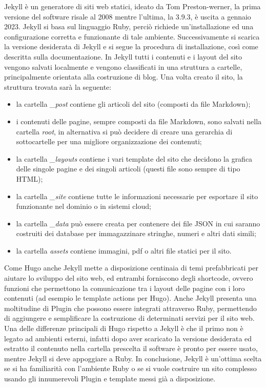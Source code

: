 \documentclass[target=bach,aauheader=]{thud}
\begin{document}
Jekyll è un generatore di siti web statici, ideato da Tom Preston-werner, la prima versione del software risale al 2008 mentre l'ultima, la 3.9.3, è uscita a gennaio 2023.
Jekyll si basa sul linguaggio Ruby, perciò richiede un'installazione ed una configurazione corretta e funzionante di tale ambiente.
Successivamente si scarica la versione desiderata di Jekyll e si segue la procedura di installazione, così come descritta sulla documentazione.
In Jekyll tutti i contenuti e i layout del sito vengono salvati localmente e vengono classificati in una struttura a cartelle, principalmente orientata alla costruzione di blog. \newline
Una volta creato il sito, la struttura trovata sarà la seguente:
\begin{itemize}
    \item la cartella \textit{\_post} contiene gli articoli del sito (composti da file Markdown);
    \item i contenuti delle pagine, sempre composti da file Markdown, sono salvati nella cartella \textit{root}, in alternativa si può decidere di creare una gerarchia di sottocartelle per una migliore organizzazione dei contenuti;
    \item la cartella \textit{\_layouts} contiene i vari template del sito che decidono la grafica delle singole pagine e dei singoli articoli (questi file sono sempre di tipo HTML);
    \item la cartella \textit{\_site} contiene tutte le informazioni necessarie per esportare il sito funzionante nel dominio o in sistemi cloud;
    \item la cartella \textit{\_data} può essere creata per contenere dei file JSON in cui saranno costruiti dei database per immagazzinare stringhe, numeri e altri dati simili;
    \item la cartella \textit{assets} contiene immagini, pdf o altri file statici per il sito.
\end{itemize}
Come Hugo anche Jekyll mette a disposizione centinaia di temi prefabbricati per aiutare lo sviluppo del sito web, ed entrambi forniscono degli shortcode, ovvero funzioni che permettono la comunicazione tra i layout delle pagine con i loro contenuti (ad esempio le template actions per Hugo).
Anche Jekyll presenta una moltitudine di Plugin che possono essere integrati attraverso Ruby, permettendo di aggiungere e semplificare la costruzione di determinati servizi per il sito web. \newline
Una delle differenze principali di Hugo rispetto a Jekyll è che il primo non è legato ad ambienti esterni, infatti dopo aver scaricato la versione desiderata ed estratto il contenuto nella cartella prescelta il software è pronto per essere usato, mentre Jekyll si deve appoggiare a Ruby.
In conclusione, Jekyll è un'ottima scelta se si ha familiarità con l'ambiente Ruby o se si vuole costruire un sito complesso usando gli innumerevoli Plugin e template messi già a disposizione. 
\end{document}
